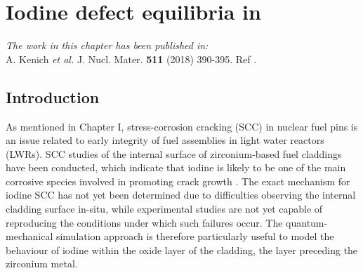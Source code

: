 \chapter{Iodine defect equilibria in \zirconia}

\emph{The work in this chapter has been published in:} \\ A. Kenich \emph{et al.} J. Nucl. Mater. \textbf{511} (2018) 390-395. Ref \cite{kenichiodine2018}.

\label{ch:results2}

\section{Introduction}

As mentioned in Chapter I, stress-corrosion cracking (SCC) in nuclear fuel pins is an issue related to early integrity of fuel assemblies in light water reactors (LWRs). SCC studies of the internal surface of zirconium-based fuel claddings have been conducted, which indicate that iodine is likely to be one of the main corrosive species involved in promoting crack growth \cite{rosenbaum1966interaction, bcoxpelletclad1990,fregonese2000failure,Sidky1998}. The exact mechanism for iodine SCC has not yet been determined due to difficulties observing the internal cladding surface in-situ, while experimental studies are not yet capable of reproducing the conditions under which such failures occur. The quantum-mechanical simulation approach is therefore particularly useful to model the behaviour of iodine within the oxide layer of the cladding, the layer preceding the zirconium metal. 

